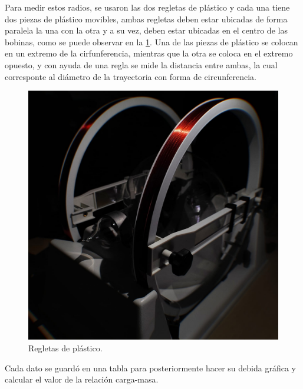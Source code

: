 Para medir estos radios, se usaron las dos regletas de plástico y cada una 
tiene dos piezas de plástico movibles, ambas regletas deben estar ubicadas de 
forma paralela la una con la otra y a su vez, deben estar ubicadas en el centro 
de las bobinas, como se puede observar en la \cref{fig:reglas}. Una de las piezas de 
plástico se colocan en un extremo de la cirfunferencia, mientras que la otra se
coloca en el extremo opuesto, y con ayuda de una regla se mide la distancia 
entre ambas, la cual corresponte al diámetro de la trayectoria con forma de 
circunferencia.

\begin{figure}[htbp!]                                                           
  \centering                                                                  
  \includegraphics[width=0.8\linewidth]{./images/reglas.jpeg}   
  \caption{Regletas de plástico.}                                             
  \label{fig:reglas}                                                          
\end{figure}

Cada dato se guardó en una tabla para posteriormente hacer su debida gráfica y
calcular el valor de la relación carga-masa.
